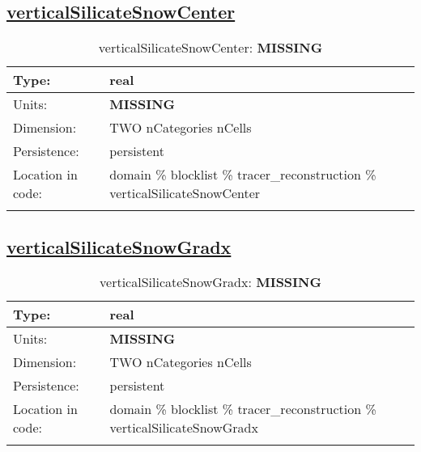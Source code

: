 \subsection[verticalSilicateSnowCenter]{\hyperref[sec:var_tab_tracer_reconstruction]{verticalSilicateSnowCenter}}
\label{subsec:var_sec_tracer_reconstruction_verticalSilicateSnowCenter}
\begin{center}
\begin{longtable}{| p{2.0in} | p{4.0in} |}
        \hline 
        Type: & real \\
        \hline 
        Units: & {\bf \color{red} MISSING} \\
        \hline 
        Dimension: & TWO nCategories nCells \\
        \hline 
        Persistence: & persistent \\
        \hline 
         Location in code: & domain \% blocklist \% tracer\_reconstruction \% verticalSilicateSnowCenter \\
         \hline 
    \caption{verticalSilicateSnowCenter: {\bf \color{red} MISSING}}
\end{longtable}
\end{center}
\subsection[verticalSilicateSnowGradx]{\hyperref[sec:var_tab_tracer_reconstruction]{verticalSilicateSnowGradx}}
\label{subsec:var_sec_tracer_reconstruction_verticalSilicateSnowGradx}
\begin{center}
\begin{longtable}{| p{2.0in} | p{4.0in} |}
        \hline 
        Type: & real \\
        \hline 
        Units: & {\bf \color{red} MISSING} \\
        \hline 
        Dimension: & TWO nCategories nCells \\
        \hline 
        Persistence: & persistent \\
        \hline 
         Location in code: & domain \% blocklist \% tracer\_reconstruction \% verticalSilicateSnowGradx \\
         \hline 
    \caption{verticalSilicateSnowGradx: {\bf \color{red} MISSING}}
\end{longtable}
\end{center}
